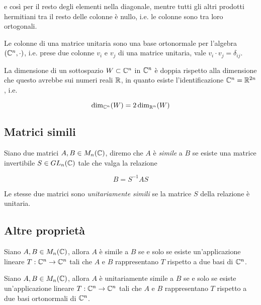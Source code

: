 e così per il resto degli elementi nella diagonale, mentre tutti gli altri prodotti hermitiani tra il resto delle colonne è nullo, i.e. le colonne sono tra loro ortogonali.

\begin{definition}
	Le colonne di una matrice unitaria sono una base ortonormale per l'algebra $ (\mathbb{C}^{n},\cdot) $, i.e. prese due colonne $ v_{i} $ e $ v_{j} $ di una matrice unitaria, vale $ v_{i} \cdot v_{j} = \delta_{ij} $.
\end{definition}


\begin{definition}
	La dimensione di un sottospazio $ W \subset \mathbb{C}^{n} $ in $ \mathbb{C}^{n} $ è doppia rispetto alla dimensione che questo avrebbe sui numeri reali $ \mathbb{R} $, in quanto esiste l'identificazione $ \mathbb{C}^{n} = \mathbb{R}^{2n} $, i.e.

	\begin{equation}
		\dim_{\mathbb{C}^{n}}(W) = 2 \dim_{\mathbb{R}^{n}}(W)
	\end{equation}
\end{definition}

\subsection{Matrici simili}

Siano due matrici $ A,B \in M_{n}(\mathbb{C}) $, diremo che $ A $ è \textit{simile} a $ B $ se esiste una matrice invertibile $ S \in GL_{n}(\mathbb{C}) $ tale che valga la relazione

\begin{equation}
	B = S^{-1} A S
\end{equation}

Le stesse due matrici sono \textit{unitariamente simili} se la matrice $ S $ della relazione è unitaria.

\subsection{Altre proprietà}

\begin{definition}
	Siano $ A,B \in M_{n}(\mathbb{C}) $, allora $ A $ è simile a $ B $ se e solo se esiste un'applicazione lineare $ T : \mathbb{C}^{n} \to \mathbb{C}^{n} $ tali che $ A $ e $ B $ rappresentano $ T $ rispetto a due basi di $ \mathbb{C}^{n} $.
\end{definition}

\begin{definition}
	Siano $ A,B \in M_{n}(\mathbb{C}) $, allora $ A $ è unitariamente simile a $ B $ se e solo se esiste un'applicazione lineare $ T : \mathbb{C}^{n} \to \mathbb{C}^{n} $ tali che $ A $ e $ B $ rappresentano $ T $ rispetto a due basi ortonormali di $ \mathbb{C}^{n} $.
\end{definition}

